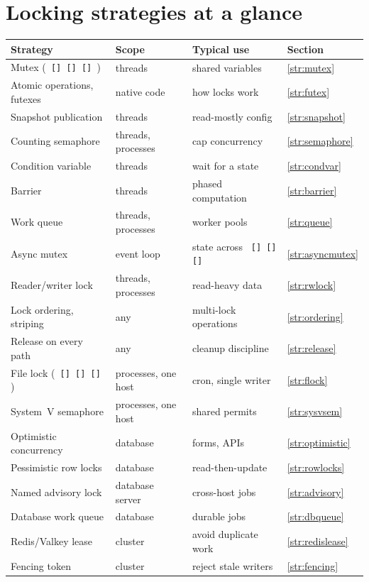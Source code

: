 \documentclass[11pt,openany]{book}
\makeatletter
\renewcommand{\arraystretch}{1.20}
\DeclareRobustCommand{\code}[1]{\texttt{\expandafter\code@quotes\expandafter{\detokenize{#1}}}}
\newcommand{\code@quotes}[1]{\saveexpandmode\expandarg
  \StrSubstitute{#1}{'}{\noexpand\textquotesingle}[\code@tmp]%
  \StrSubstitute{\code@tmp}{`}{\noexpand\textasciigrave}[\code@tmp]%
  \StrSubstitute{\code@tmp}{::}{::\noexpand\allowbreak}[\code@tmp]%
  \restoreexpandmode\code@tmp}
\makeatother
\begin{document}
\section*{Locking strategies at a glance}
\begingroup\small\renewcommand{\arraystretch}{1.03}
\begin{longtable}{L{.30\linewidth}L{.24\linewidth}L{.24\linewidth}L{.10\linewidth}}\toprule Strategy & Scope & Typical use & Section \\ \midrule\endhead
Mutex (\code{lock}) & threads & shared variables & \ref{str:mutex} \\
Atomic operations, futexes & native code & how locks work & \ref{str:futex} \\
Snapshot publication & threads & read-mostly config & \ref{str:snapshot} \\
Counting semaphore & threads, processes & cap concurrency & \ref{str:semaphore} \\
Condition variable & threads & wait for a state & \ref{str:condvar} \\
Barrier & threads & phased computation & \ref{str:barrier} \\
Work queue & threads, processes & worker pools & \ref{str:queue} \\
Async mutex & event loop & state across \code{await} & \ref{str:asyncmutex} \\
Reader/writer lock & threads, processes & read-heavy data & \ref{str:rwlock} \\
Lock ordering, striping & any & multi-lock operations & \ref{str:ordering} \\
Release on every path & any & cleanup discipline & \ref{str:release} \\
File lock (\code{flock}) & processes, one host & cron, single writer & \ref{str:flock} \\
System~V semaphore & processes, one host & shared permits & \ref{str:sysvsem} \\
Optimistic concurrency & database & forms, APIs & \ref{str:optimistic} \\
Pessimistic row locks & database & read-then-update & \ref{str:rowlocks} \\
Named advisory lock & database server & cross-host jobs & \ref{str:advisory} \\
Database work queue & database & durable jobs & \ref{str:dbqueue} \\
Redis/Valkey lease & cluster & avoid duplicate work & \ref{str:redislease} \\
Fencing token & cluster & reject stale writers & \ref{str:fencing} \\

\end{longtable}
\end{document}
